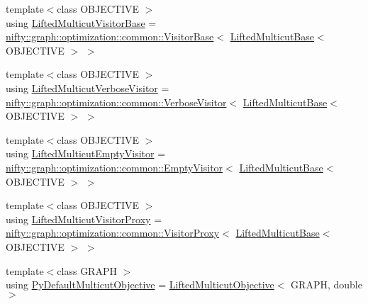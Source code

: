 \begin{DoxyCompactItemize}
\item 
{\footnotesize template$<$class O\+B\+J\+E\+C\+T\+I\+V\+E $>$ }\\using \hyperlink{namespacenifty_1_1graph_1_1lifted__multicut_a0bb4a638bd7a5b2b2f64a9be0df46775}{Lifted\+Multicut\+Visitor\+Base} = \hyperlink{classnifty_1_1graph_1_1optimization_1_1common_1_1VisitorBase}{nifty\+::graph\+::optimization\+::common\+::\+Visitor\+Base}$<$ \hyperlink{classnifty_1_1graph_1_1lifted__multicut_1_1LiftedMulticutBase}{Lifted\+Multicut\+Base}$<$ O\+B\+J\+E\+C\+T\+I\+V\+E $>$ $>$
\item 
{\footnotesize template$<$class O\+B\+J\+E\+C\+T\+I\+V\+E $>$ }\\using \hyperlink{namespacenifty_1_1graph_1_1lifted__multicut_a1f2e6a84e0ecc2118bb2c5d73c752cbe}{Lifted\+Multicut\+Verbose\+Visitor} = \hyperlink{classnifty_1_1graph_1_1optimization_1_1common_1_1VerboseVisitor}{nifty\+::graph\+::optimization\+::common\+::\+Verbose\+Visitor}$<$ \hyperlink{classnifty_1_1graph_1_1lifted__multicut_1_1LiftedMulticutBase}{Lifted\+Multicut\+Base}$<$ O\+B\+J\+E\+C\+T\+I\+V\+E $>$ $>$
\item 
{\footnotesize template$<$class O\+B\+J\+E\+C\+T\+I\+V\+E $>$ }\\using \hyperlink{namespacenifty_1_1graph_1_1lifted__multicut_ae8d3a07757ca6e27f2ea6ffc810c8a75}{Lifted\+Multicut\+Empty\+Visitor} = \hyperlink{classnifty_1_1graph_1_1optimization_1_1common_1_1EmptyVisitor}{nifty\+::graph\+::optimization\+::common\+::\+Empty\+Visitor}$<$ \hyperlink{classnifty_1_1graph_1_1lifted__multicut_1_1LiftedMulticutBase}{Lifted\+Multicut\+Base}$<$ O\+B\+J\+E\+C\+T\+I\+V\+E $>$ $>$
\item 
{\footnotesize template$<$class O\+B\+J\+E\+C\+T\+I\+V\+E $>$ }\\using \hyperlink{namespacenifty_1_1graph_1_1lifted__multicut_ae0f8360a0bdf9d1caa577c1889fda20c}{Lifted\+Multicut\+Visitor\+Proxy} = \hyperlink{classnifty_1_1graph_1_1optimization_1_1common_1_1VisitorProxy}{nifty\+::graph\+::optimization\+::common\+::\+Visitor\+Proxy}$<$ \hyperlink{classnifty_1_1graph_1_1lifted__multicut_1_1LiftedMulticutBase}{Lifted\+Multicut\+Base}$<$ O\+B\+J\+E\+C\+T\+I\+V\+E $>$ $>$
\item 
{\footnotesize template$<$class G\+R\+A\+P\+H $>$ }\\using \hyperlink{namespacenifty_1_1graph_1_1lifted__multicut_aa2646f38679a289646a62e306949995d}{Py\+Default\+Multicut\+Objective} = \hyperlink{classnifty_1_1graph_1_1lifted__multicut_1_1LiftedMulticutObjective}{Lifted\+Multicut\+Objective}$<$ G\+R\+A\+P\+H, double $>$
\end{DoxyCompactItemize}
